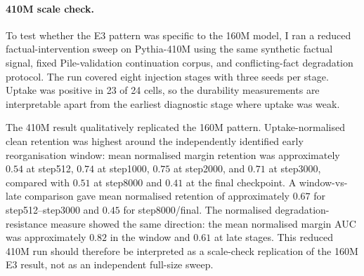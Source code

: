 
\paragraph{410M scale check.}
To test whether the E3 pattern was specific to the 160M model, I ran a reduced factual-intervention sweep on Pythia-410M using the same synthetic factual signal, fixed Pile-validation continuation corpus, and conflicting-fact degradation protocol. The run covered eight injection stages with three seeds per stage. Uptake was positive in 23 of 24 cells, so the durability measurements are interpretable apart from the earliest diagnostic stage where uptake was weak.

The 410M result qualitatively replicated the 160M pattern. Uptake-normalised clean retention was highest around the independently identified early reorganisation window: mean normalised margin retention was approximately $0.54$ at step512, $0.74$ at step1000, $0.75$ at step2000, and $0.71$ at step3000, compared with $0.51$ at step8000 and $0.41$ at the final checkpoint. A window-vs-late comparison gave mean normalised retention of approximately $0.67$ for step512--step3000 and $0.45$ for step8000/final. The normalised degradation-resistance measure showed the same direction: the mean normalised margin AUC was approximately $0.82$ in the window and $0.61$ at late stages. This reduced 410M run should therefore be interpreted as a scale-check replication of the 160M E3 result, not as an independent full-size sweep.
